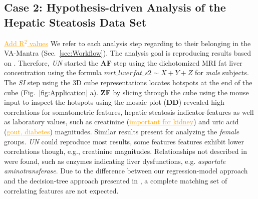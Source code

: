 \documentclass[journal]{style/vgtc} 			          %
\newcommand{\com}[1]{\textcolor{orange}{\uline{#1}}}
\begin{document}
\subsection{Case 2: Hypothesis-driven Analysis of the Hepatic Steatosis Data Set}
\com{Add R$^2$ values}
We refer to each analysis step regarding to their belonging in the VA-Mantra (Sec.~\ref{sec:Workflow}).
The analysis goal is reproducing results based on \cite{Niemann2014}.
Therefore, \emph{UN} started the \textbf{AF} step using the dichotomized MRI fat liver concentration using the formula $mrt\_liverfat\_s2 \sim X + Y + Z$ for \emph{male} subjects.
The \emph{SI} step using the 3D cube representations locates hotspots at the end of the cube (Fig.~\ref{fig:Application} a).
\textbf{ZF} by slicing through the cube using the mouse input to inspect the hotspots using the mosaic plot (\textbf{DD}) revealed high correlations for somatometric features, hepatic steatosis indicator-features as well as laboratory values, such as creatinine (\com{important for kidney}) and uric acid (\com{gout, diabetes}) magnitudes.
Similar results present for analyzing the \emph{female} groups.
\emph{UN} could reproduce most results, some features features exhibit lower correlations though, e.g., creatinine magnitudes.
Relationships not described in \cite{Niemann2014} were found, such as enzymes indicating liver dysfunctions, e.g. \emph{aspartate aminotransferase}.
Due to the difference between our regression-model approach and the decision-tree approach presented in \cite{Niemann2014}, a complete matching set of correlating features are not expected.
\end{document}
